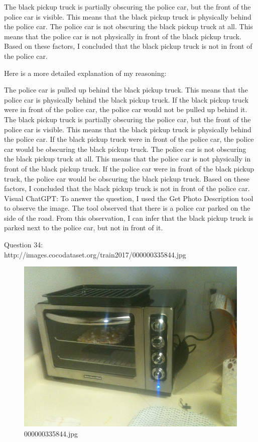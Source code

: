 \begin{enumerate}
        The black pickup truck is partially obscuring the police car, but the front of the police car is visible. This means that the black pickup truck is physically behind the police car.
        The police car is not obscuring the black pickup truck at all. This means that the police car is not physically in front of the black pickup truck.
        Based on these factors, I concluded that the black pickup truck is not in front of the police car.
        
        Here is a more detailed explanation of my reasoning:
        
        The police car is pulled up behind the black pickup truck. This means that the police car is physically behind the black pickup truck. If the black pickup truck were in front of the police car, the police car would not be pulled up behind it.
        The black pickup truck is partially obscuring the police car, but the front of the police car is visible. This means that the black pickup truck is physically behind the police car. If the black pickup truck were in front of the police car, the police car would be obscuring the black pickup truck.
        The police car is not obscuring the black pickup truck at all. This means that the police car is not physically in front of the black pickup truck. If the police car were in front of the black pickup truck, the police car would be obscuring the black pickup truck.
        Based on these factors, I concluded that the black pickup truck is not in front of the police car.
        \subitem Visual ChatGPT: To answer the question, I used the Get Photo Description tool to observe the image. The tool observed that there is a police car parked on the side of the road. From this observation, I can infer that the black pickup truck is parked next to the police car, but not in front of it.
    \end{enumerate}
    Question 34:\\http://images.cocodataset.org/train2017/000000335844.jpg
    \begin{figure}[h]
        \centering
        \includegraphics[width=0.8\linewidth]{../image set/easy/000000335844.jpg}
        \caption{000000335844.jpg}
    \end{figure}
